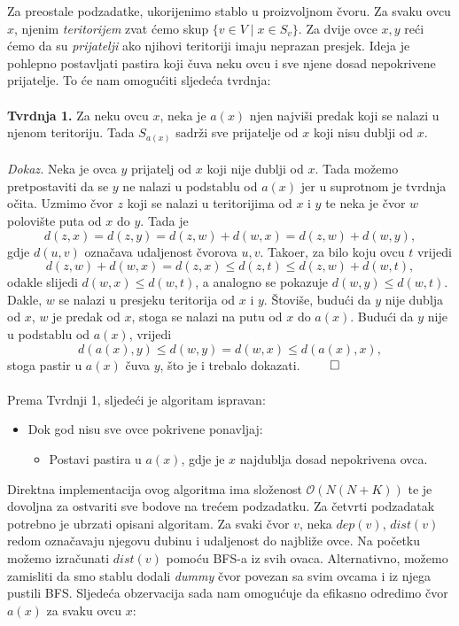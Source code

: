Za preostale podzadatke, ukorijenimo stablo u proizvoljnom čvoru. Za svaku ovcu $x$, njenim \emph{teritorijem} zvat ćemo skup $\{v \in V \mid x \in S_v\}$. Za dvije ovce $x, y$ reći ćemo da su \emph{prijatelji} ako njihovi teritoriji imaju neprazan presjek. Ideja je pohlepno postavljati pastira koji čuva neku ovcu i sve njene dosad nepokrivene prijatelje. To će nam omogućiti sljedeća tvrdnja:
\\\\
\textbf{Tvrdnja 1.} Za neku ovcu $x$, neka je $a(x)$ njen najviši predak koji se nalazi u njenom teritoriju. Tada $S_{a(x)}$ sadrži sve prijatelje od $x$ koji nisu dublji od $x$.
\\\\
\textit{Dokaz.} Neka je ovca $y$ prijatelj od $x$ koji nije dublji od $x$. Tada možemo pretpostaviti da se $y$ ne nalazi u podstablu od $a(x)$ jer u suprotnom je tvrdnja očita. Uzmimo čvor $z$ koji se nalazi u teritorijima od $x$ i $y$ te neka je čvor $w$ polovište puta od $x$ do $y$. Tada je 
\newpage 
$$d(z, x) = d(z, y) = d(z, w) + d(w, x) = d(z, w) + d(w, y),$$ gdje $d(u, v)$ označava udaljenost čvorova $u, v$. Tako\dj er, za bilo koju ovcu $t$ vrijedi $$d(z, w) + d(w, x) = d(z, x) \leq d(z, t) \leq d(z, w) + d(w, t),$$ odakle slijedi $d(w, x) \leq d(w, t)$, a analogno se pokazuje $d(w, y) \leq d(w, t)$. Dakle, $w$ se nalazi u presjeku teritorija od $x$ i $y$. Štoviše, budući da $y$ nije dublja od $x$, $w$ je predak od $x$, stoga se nalazi na putu od $x$ do $a(x)$. Budući da $y$ nije u podstablu od $a(x)$, vrijedi $$d(a(x), y) \leq d(w, y) = d(w, x) \leq d(a(x), x),$$ stoga pastir u $a(x)$ čuva $y$, što je i trebalo dokazati. $\qed$
\\\\
Prema Tvrdnji 1, sljedeći je algoritam ispravan:
\begin{itemize}
    \item Dok god nisu sve ovce pokrivene ponavljaj:
    \begin{itemize}
        \item Postavi pastira u $a(x)$, gdje je $x$ najdublja dosad nepokrivena ovca.
    \end{itemize}
\end{itemize}
Direktna implementacija ovog algoritma ima složenost $\mathcal{O}(N(N + K))$ te je dovoljna za ostvariti sve bodove na trećem podzadatku. Za četvrti podzadatak potrebno je ubrzati opisani algoritam. Za svaki čvor $v$, neka $dep(v)$, $dist(v)$ redom označavaju njegovu dubinu i udaljenost do najbliže ovce. Na početku možemo izračunati $dist(v)$ pomoću BFS-a iz svih ovaca. Alternativno, možemo zamisliti da smo stablu dodali \emph{dummy} čvor povezan sa svim ovcama i iz njega pustili BFS. Sljedeća obzervacija sada nam omogućuje da efikasno odredimo čvor $a(x)$ za svaku ovcu $x$:
